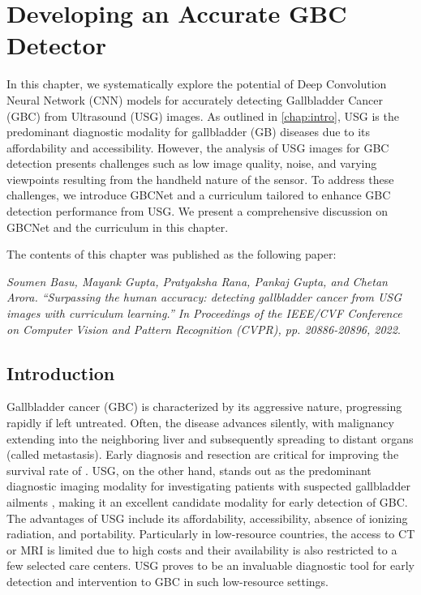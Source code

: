 \chapter{Developing an Accurate GBC Detector}
%
\label{chap:gbcnet}
%
In this chapter, we systematically explore the potential of Deep Convolution Neural Network (CNN) models for accurately detecting Gallbladder Cancer (GBC) from Ultrasound (USG) images. As outlined in \cref{chap:intro}, USG is the predominant diagnostic modality for gallbladder (GB) diseases due to its affordability and accessibility. However, the analysis of USG images for GBC detection presents challenges such as low image quality, noise, and varying viewpoints resulting from the handheld nature of the sensor. To address these challenges, we introduce GBCNet and a curriculum tailored to enhance GBC detection performance from USG. We present a comprehensive discussion on GBCNet and the curriculum in this chapter.
\par The contents of this chapter was published as the following paper:
\par [1] \textit{Soumen Basu, Mayank Gupta, Pratyaksha Rana, Pankaj Gupta, and Chetan Arora. ``Surpassing the human accuracy: detecting gallbladder cancer from USG images with curriculum learning.'' In Proceedings of the IEEE/CVF Conference on Computer Vision and Pattern Recognition (CVPR), pp. 20886-20896, 2022}.

\section{Introduction}
%
Gallbladder cancer (GBC) is characterized by its aggressive nature, progressing rapidly if left untreated. Often, the disease advances silently, with malignancy extending into the neighboring liver and subsequently spreading to distant organs (called metastasis). Early diagnosis and resection are critical for improving the survival rate of \gbc. USG, on the other hand, stands out as the predominant diagnostic imaging modality for investigating patients with suspected gallbladder ailments \cite{klibanov2015ultrasound}, making it an excellent candidate modality for early detection of GBC. The advantages of USG include its affordability, accessibility, absence of ionizing radiation, and portability. Particularly in low-resource countries, the access to CT or MRI is limited due to high costs and their availability is also restricted to a few selected care centers. USG proves to be an invaluable diagnostic tool for early detection and intervention to GBC in such low-resource settings.

